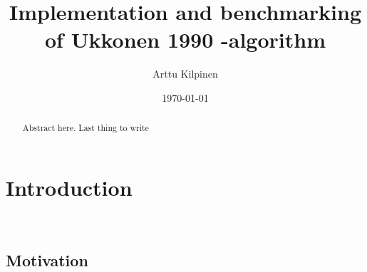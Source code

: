 \documentclass[english,twoside,censored,csm,algorithms-track-2020]{HYthesisML}
\title{Implementation and benchmarking of Ukkonen 1990 -algorithm}
\author{Arttu Kilpinen}
\date{\today}
\theoremstyle{plain}
\theoremstyle{definition}
\begin{document}
\maketitle



\begin{abstract}

  Abstract here. Last thing to write

\end{abstract}

\newpage
\mytableofcontents
\mainmatter


%
%
%
%




\chapter{Introduction}~\label{chp-intro}

\section{Motivation}
  
\end{document}
